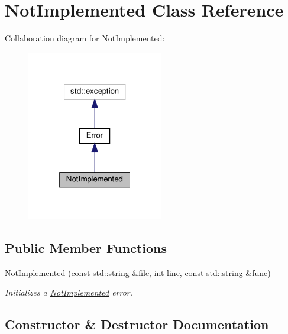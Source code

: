 \hypertarget{classNotImplemented}{}\section{Not\+Implemented Class Reference}
\label{classNotImplemented}


Collaboration diagram for Not\+Implemented\+:
\nopagebreak
\begin{figure}[H]
\begin{center}
\leavevmode
\includegraphics[width=169pt]{classNotImplemented__coll__graph}
\end{center}
\end{figure}
\subsection*{Public Member Functions}
\begin{DoxyCompactItemize}
\item 
\hyperlink{classNotImplemented_a744fb791ca16c8d500eaae24ec113aec}{Not\+Implemented} (const std\+::string \&file, int line, const std\+::string \&func)
\begin{DoxyCompactList}\small\item\em Initializes a \hyperlink{classNotImplemented}{Not\+Implemented} error. \end{DoxyCompactList}\end{DoxyCompactItemize}


\subsection{Constructor \& Destructor Documentation}
\mbox{\label{classNotImplemented_a744fb791ca16c8d500eaae24ec113aec}} 
